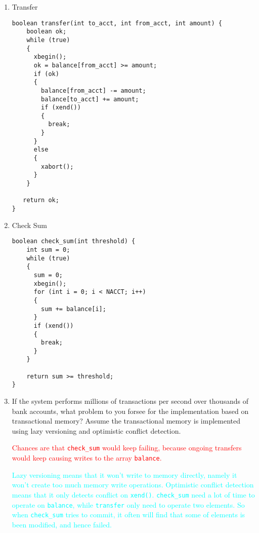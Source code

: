 \documentclass[11pt]{article}
\newenvironment{answer}{\begin{minipage}[c][2.0in]{\textwidth}}{\end{minipage}}
\begin{document}
\begin{enumerate}
\item Transfer
\begin{lstlisting}
boolean transfer(int to_acct, int from_acct, int amount) {
    boolean ok;
    while (true)
    {
      xbegin();
      ok = balance[from_acct] >= amount;
      if (ok)
      {
        balance[from_acct] -= amount;
        balance[to_acct] += amount;
        if (xend())
        {
          break;
        }
      }
      else
      {
        xabort();
      }
    }

   return ok;
}
\end{lstlisting}

\item Check Sum
\begin{lstlisting}
boolean check_sum(int threshold) {
    int sum = 0;
    while (true)
    {
      sum = 0;
      xbegin();
      for (int i = 0; i < NACCT; i++)
      {
        sum += balance[i];
      }
      if (xend())
      {
        break;
      }
    }

    return sum >= threshold;
}
\end{lstlisting}
\item If the system performs millions of transactions per second over
  thousands of bank accounts, what problem to you forsee for the  implementation based on transactional memory?
  Assume the transactional memory is implemented using lazy versioning and optimistic conflict detection.

\begin{answer}

\textcolor{red}{Chances are that \lstinline{check_sum} would keep failing, because ongoing 
transfers would keep causing writes to the array \lstinline{balance}.}

\textcolor{cyan}{Lazy versioning means that it won't write to memory directly, namely it won't 
create too much memory write operations. Optimistic conflict detection means that it only detects
conflict on \lstinline{xend()}. \lstinline{check_sum} need a lot of time to operate on 
\lstinline{balance}, while \lstinline{transfer} only need to operate two elements. So when 
\lstinline{check_sum} tries to commit, it often will find that some of elements is been
modified, and hence failed. }

\end{answer}
\end{enumerate}
\end{document}
